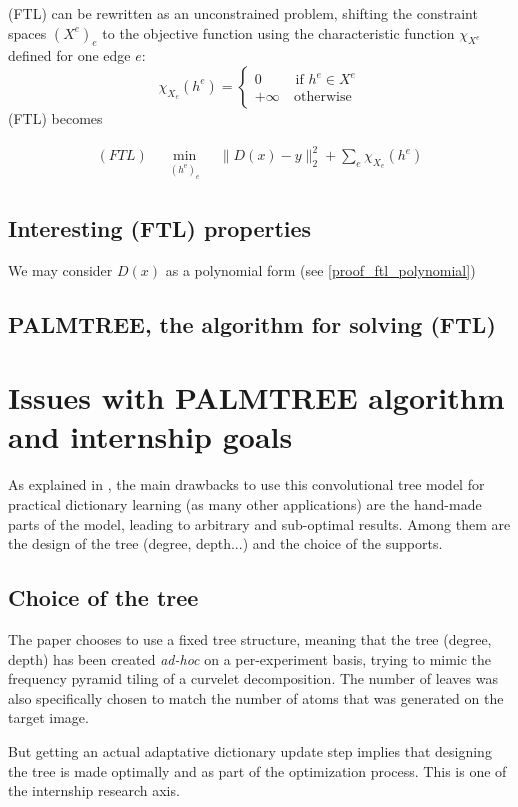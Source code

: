 (FTL) can be rewritten as an unconstrained problem, shifting the constraint spaces $(X^e)_e$ to the objective function using the characteristic function $\chi_{X^e}$defined for one edge $e$:
$$\chi_{X_e}(h^e) = \begin{cases} 0 &\text{ if } h^e \in X^e \\ +\infty & \ \text{otherwise}\end{cases}$$
(FTL) becomes

\begin{align}
(FTL) \quad \underset{\substack{(h^\text{e})_{e}}}\min & \lVert D(x) - y \rVert_2^2 + \sum_{e}\chi_{X_e} (h^e)
\end{align}

\subsection{Interesting (FTL) properties}
We may consider $D(x)$ as a polynomial form (see \ref{proof_ftl_polynomial}) %

\subsection{PALMTREE, the algorithm for solving (FTL)}

\section{Issues with PALMTREE algorithm and internship goals}
As explained in \cite[p. 23]{chabiron_optimization_2016}, the main drawbacks to use this convolutional tree model for practical dictionary learning (as many other applications) are the hand-made parts of the model, leading to arbitrary and sub-optimal results. Among them are the design of the tree (degree, depth...) and the choice of the supports. %
\subsection{Choice of the tree}
The paper chooses to use a fixed tree structure, meaning that the tree (degree, depth) has been created \emph{ad-hoc} on a per-experiment basis, trying to mimic the frequency pyramid tiling of a curvelet decomposition. The number of leaves was also specifically chosen to match the number of atoms that was generated on the target image.

But getting an actual adaptative dictionary update step implies that designing the tree is made optimally and as part of the optimization process. This is one of the internship research axis.

